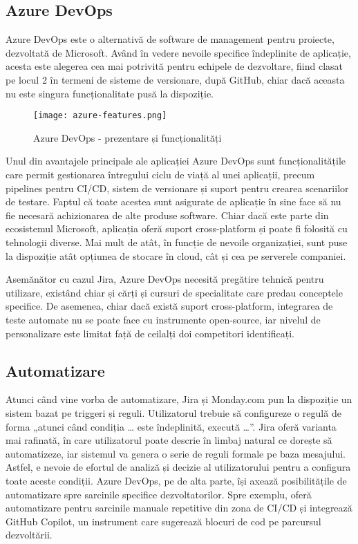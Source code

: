 \subsection{Azure DevOps}

Azure DevOps este o alternativă de software de management pentru proiecte, dezvoltată de Microsoft. Având în vedere nevoile specifice îndeplinite de aplicație, acesta este alegerea cea mai potrivită pentru echipele de dezvoltare, fiind clasat pe locul 2 în termeni de sisteme de versionare, după GitHub\cite{6sense-azure}, chiar dacă aceasta nu este singura funcționalitate pusă la dispoziție. 

 \begin{figure}[H]
	\centering
 	 \texttt{[image: azure-features.png]}
	\caption{Azure DevOps - prezentare și funcționalități \cite{azure-website}}
	\label{fig:azure-features}
 \end{figure}

Unul din avantajele principale ale aplicației Azure DevOps sunt funcționalitățile care permit gestionarea întregului ciclu de viață al unei aplicații, precum pipelines pentru CI/CD, sistem de versionare și suport pentru crearea scenariilor de testare. Faptul că toate acestea sunt asigurate de aplicație în sine face să nu fie necesară achizionarea de alte produse software. Chiar dacă este parte din ecosistemul Microsoft, aplicația oferă suport cross-platform și poate fi folosită cu tehnologii diverse. Mai mult de atât, în funcție de nevoile organizației, sunt puse la dispoziție atât opțiunea de stocare în cloud, cât și cea pe serverele companiei\cite{azure-features}. 

Asemănător cu cazul Jira, Azure DevOps necesită pregătire tehnică pentru utilizare, existând chiar și cărți și cursuri de specialitate care predau conceptele specifice. De asemenea, chiar dacă există suport cross-platform, integrarea de teste automate nu se poate face cu instrumente open-source, iar nivelul de personalizare este limitat față de ceilalți doi competitori identificați.

\subsection{Automatizare}

Atunci când vine vorba de automatizare, Jira și Monday.com pun la dispoziție un sistem bazat pe triggeri și reguli. Utilizatorul trebuie să configureze o regulă de forma „atunci când condiția … este îndeplinită, execută …”. Jira oferă varianta mai rafinată, în care utilizatorul poate descrie în limbaj natural ce dorește să automatizeze, iar sistemul va genera o serie de reguli formale pe baza mesajului. Astfel, e nevoie de efortul de analiză și decizie al utilizatorului pentru a configura toate aceste condiții. Azure DevOps, pe de alta parte, își axează posibilitățile de automatizare spre sarcinile specifice dezvoltatorilor. Spre exemplu, oferă automatizare pentru sarcinile manuale repetitive din zona de CI/CD și integrează GitHub Copilot, un instrument care sugerează blocuri de cod pe parcursul dezvoltării.

